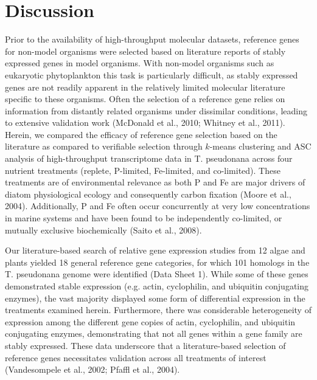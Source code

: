 \section{Discussion}
	Prior to the availability of high-throughput molecular datasets, reference genes for non-model organisms were selected based on literature reports of stably expressed genes in model organisms. With non-model organisms such as eukaryotic phytoplankton this task is particularly difficult, as stably expressed genes are not readily apparent in the relatively limited molecular literature specific to these organisms. Often the selection of a reference gene relies on information from distantly related organisms under dissimilar conditions, leading to extensive validation work (McDonald et al., 2010; Whitney et al., 2011). Herein, we compared the efficacy of reference gene selection based on the literature as compared to verifiable selection through $k$-means clustering and ASC analysis of high-throughput transcriptome data in T. pseudonana across four nutrient treatments (replete, P-limited, Fe-limited, and co-limited). These treatments are of environmental relevance as both P and Fe are major drivers of diatom physiological ecology and consequently carbon fixation (Moore et al., 2004). Additionally, P and Fe often occur concurrently at very low concentrations in marine systems and have been found to be independently co-limited, or mutually exclusive biochemically (Saito et al., 2008).\par
	Our literature-based search of relative gene expression studies from 12 algae and plants yielded 18 general reference gene categories, for which 101 homologs in the T. pseudonana genome were identified (Data Sheet 1). While some of these genes demonstrated stable expression (e.g. actin, cyclophilin, and ubiquitin conjugating enzymes), the vast majority displayed some form of differential expression in the treatments examined herein. Furthermore, there was considerable heterogeneity of expression among the different gene copies of actin, cyclophilin, and ubiquitin conjugating enzymes, demonstrating that not all genes within a gene family are stably expressed. These data underscore that a literature-based selection of reference genes necessitates validation across all treatments of interest (Vandesompele et al., 2002; Pfaffl et al., 2004). \par
